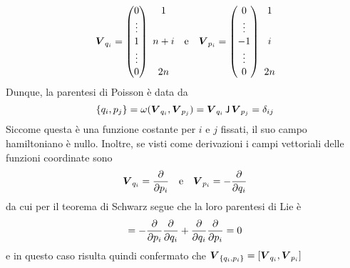 \begin{equation}
  \vec{V}_{q_i} = \pmqty{0 \\ \vdots \\ 1 \\ \vdots \\ 0}\ \mqty{1 \\ \phantom{\vdots} \\ n+i \\ \phantom{\vdots} \\ 2n} \qqtext{e} 
  \vec{V}_{p_i} = \pmqty{0 \\ \vdots \\ -1 \\ \vdots \\ 0}\ \mqty{1 \\ \phantom{\vdots} \\ i \\ \phantom{\vdots} \\ 2n}
\end{equation} 
Dunque, la parentesi di Poisson è data da
\begin{equation}
\pb{q_i}{p_j} = \omega(\vec{V}_{q_i}, \vec{V}_{p_j}) = \vec{V}_{q_i}\, \mathsf{J}\, \vec{V}_{p_j} = \delta_{ij}
\end{equation}
Siccome questa è una funzione costante per $i$ e $j$ fissati, il suo campo hamiltoniano è nullo. Inoltre, se visti come derivazioni i campi vettoriali delle funzioni coordinate sono 
\begin{equation}
\vec{V}_{q_i} = \pdv{p_i} \qqtext{e} \vec{V}_{p_i} = -\pdv{q_i}
\end{equation}
da cui per il teorema di Schwarz segue che la loro parentesi di Lie è 
\begin{equation}
[V_{q_i}, V_{p_i}] = -\pdv{p_i}\pdv{q_i} + \pdv{q_i}\pdv{p_i} = 0
\end{equation}
e in questo caso risulta quindi confermato che $\vec{V}_{\pb{q_i}{p_i}} = [\vec{V}_{q_i}, \vec{V}_{p_i}]$

